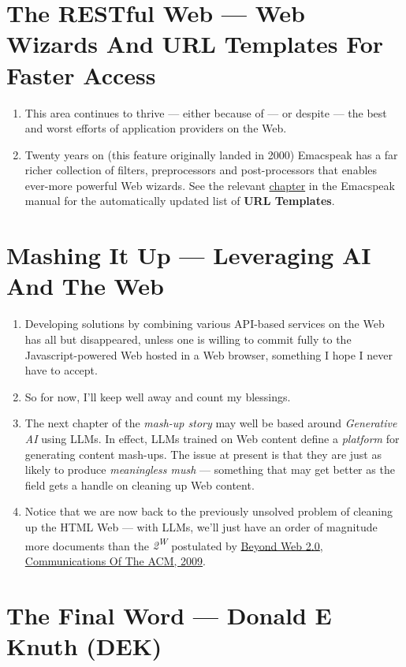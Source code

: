 \documentclass[11pt]{article}
\begin{document}
\section{The RESTful Web —  Web Wizards And URL Templates For Faster Access}
\label{sec:orgaf444e5}

\begin{enumerate}
\item This area continues to thrive --- either because of --- or
despite --- the best and worst efforts of application providers on the
Web.
\item Twenty years on (this feature originally landed in 2000)
Emacspeak has a far richer collection of filters, preprocessors
and post-processors
 that enables ever-more powerful Web
wizards. See the relevant \href{https://tvraman.github.io/emacspeak/manual/URL-Templates.html}{chapter} in the Emacspeak manual for the
automatically updated list of \textbf{URL Templates}.
\end{enumerate}
\section{Mashing It Up —  Leveraging  AI And The Web}
\label{sec:org32b1d32}

\begin{enumerate}
\item Developing solutions by combining various API-based services on
the Web has all but disappeared, unless one is willing to commit
fully to the Javascript-powered Web hosted in a Web browser,
something I hope I never have to accept.
\item So for now, I'll keep
well away and count my blessings.
\item The next chapter of the \emph{mash-up story} may well be based around
 \emph{Generative AI} using LLMs. In effect, LLMs trained on   Web content 
define a \emph{platform} for generating content mash-ups.  The issue
at present is that they are just as  likely  to produce
\emph{meaningless mush} ---
something that may  get better as the field gets a
handle on cleaning up  Web content.
\item Notice that we are now back to the previously unsolved problem
of cleaning up the  HTML Web --- with LLMs, we'll just
have an order of magnitude more documents than the \emph{2\textsuperscript{W}} postulated
 by  \href{https://research.google/blog/beyond-web-20/?hl=in\&m=1}{Beyond Web 2.0, Communications
Of The ACM, 2009}.
\end{enumerate}
\section{The Final Word --- Donald E Knuth (DEK)}
\label{sec:org0514992}
\end{document}
